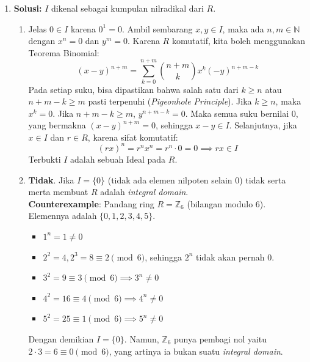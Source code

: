 \documentclass[11pt, a4paper]{article}
\begin{document}
\begin{enumerate}[leftmargin=*, label=\arabic*.]
  \item \textbf{Solusi:}
        $I$ dikenal sebagai kumpulan nilradikal dari $R$.
        \begin{enumerate}[label=(\alph*)]
          \item Jelas $0 \in I$ karena $0^1 = 0$.
                Ambil sembarang $x, y \in I$, maka ada $n, m \in \mathbb{N}$ dengan $x^n = 0$ dan $y^m = 0$.
                Karena $R$ komutatif, kita boleh menggunakan Teorema Binomial:
                \[ (x-y)^{n+m} = \sum_{k=0}^{n+m} \binom{n+m}{k} x^k (-y)^{n+m-k} \]
                Pada setiap suku, bisa dipastikan bahwa salah satu dari $k \geq n$ atau $n+m-k \geq m$ pasti terpenuhi (\textit{Pigeonhole Principle}).
                Jika $k \geq n$, maka $x^k = 0$. Jika $n+m-k \geq m$, $y^{n+m-k} = 0$.
                Maka semua suku bernilai $0$, yang bermakna $(x-y)^{n+m} = 0$, sehingga $x-y \in I$.
                Selanjutnya, jika $x \in I$ dan $r \in R$, karena sifat komutatif:
                \[ (rx)^n = r^n x^n = r^n \cdot 0 = 0 \implies rx \in I \]
                Terbukti $I$ adalah sebuah Ideal pada $R$.

          \item \textbf{Tidak}. Jika $I = \{0\}$ (tidak ada elemen nilpoten selain 0) tidak serta merta membuat $R$ adalah \textit{integral domain}. \\
                \textbf{Counterexample}:
                Pandang ring $R = \mathbb{Z}_6$ (bilangan modulo 6). Elemennya adalah $\{0, 1, 2, 3, 4, 5\}$.
                \begin{itemize}
                  \item $1^n = 1 \neq 0$
                  \item $2^2 = 4, 2^3 = 8 \equiv 2 \pmod 6$, sehingga $2^n$ tidak akan pernah 0.
                  \item $3^2 = 9 \equiv 3 \pmod 6 \implies 3^n \neq 0$
                  \item $4^2 = 16 \equiv 4 \pmod 6 \implies 4^n \neq 0$
                  \item $5^2 = 25 \equiv 1 \pmod 6 \implies 5^n \neq 0$
                \end{itemize}
                Dengan demikian $I = \{0\}$. Namun, $\mathbb{Z}_6$ punya pembagi nol yaitu $2 \cdot 3 = 6 \equiv 0 \pmod 6$, yang artinya ia bukan suatu \textit{integral domain}.
        \end{enumerate}
\end{enumerate}
\end{document}

